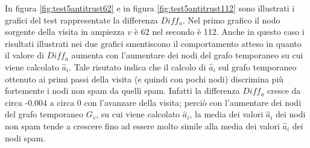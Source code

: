 In figura \ref{fig:test5antitrust62} e in figura \ref{fig:test5antitrust112} sono illustrati i grafici del test rappresentate la differenza \(Diff_a\). Nel primo grafico il nodo sorgente della visita in ampiezza \(v\) è 62 nel secondo è 112. Anche in questo caso i risultati illustrati nei due grafici smentiscono il comportamento atteso in quanto il valore di \(Diff_a\) aumenta con l'aumentare dei nodi del grafo temporaneo su cui viene calcolato \(\hat{a}_i\). Tale risutato indica che il calcolo di \(\hat{a}_i\) sul grafo temporaneo ottenuto ai primi passi della visita (e quindi con pochi nodi) discrimina più fortemente i nodi non spam da 
quelli spam. Infatti la differenza \(Diff_a\) cresce da circa -0.004 a circa 0 con l'avanzare della visita; perciò con l'aumentare dei nodi del grafo temporaneo \(G_v\), su cui viene calcolato \(\hat{a}_i\), la media dei valori \(\hat{a}_i\) dei nodi non spam tende a crescere fino ad essere molto simile alla media dei valori \(\hat{a}_i\) dei nodi spam.\\


